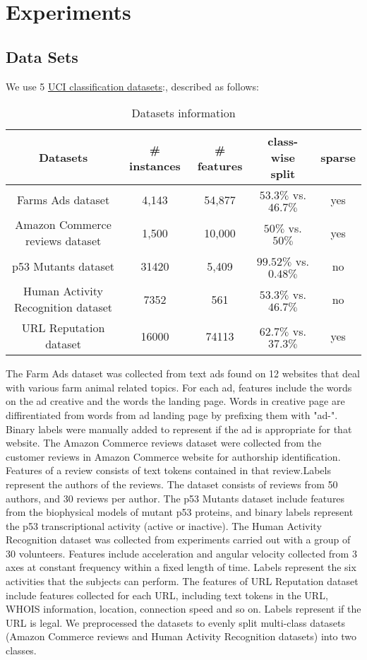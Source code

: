 \section{Experiments}
\label{sec:experiments}

\subsection{Data Sets}


We use 5 \href{http://archive.ics.uci.edu/ml/datasets.html}{UCI classification
datasets}:, described as follows:

\begin{table}
\begin{tabular}{| c | c |  c | c | c |}
  \hline
  Datasets & \# instances & \# features & class-wise split & sparse\\
  \hline
  Farms Ads dataset & 4,143 & 54,877 & $53.3\%$ vs. $46.7\%$ & yes\\
  \hline
  Amazon Commerce reviews dataset & 1,500 & 10,000 & $50\%$ vs. $50\%$ & yes \\
  \hline
  p53 Mutants dataset & 31420 & 5,409 & $99.52\%$ vs.$0.48\%$  & no\\
  \hline
  Human Activity Recognition dataset & 7352 & 561 & $53.3\%$ vs. $46.7\%$  & no\\
  \hline
  URL Reputation dataset\footnotemark[1] & 16000 & 74113 & $62.7\%$ vs. $37.3\%$ & yes \\
  \hline
\end{tabular}
\caption{Datasets information}
\end{table}
The Farm Ads dataset was collected from text ads found on 12 websites that deal with various farm animal related topics. For each ad, features include the words on the ad creative and the words the landing page. Words in creative page are diffirentiated from words from ad landing page by prefixing them with "ad-". Binary labels were manually added to represent if the ad is appropriate for that website. The Amazon Commerce reviews dataset were collected from the customer reviews in Amazon Commerce website for authorship identification. Features of a review consists of text tokens contained in that review.Labels represent the authors of the reviews. The dataset consists of reviews from 50 authors, and 30 reviews per author. The p53 Mutants dataset include features from the biophysical models of mutant p53 proteins, and binary labels represent the p53 transcriptional activity (active or inactive). The Human Activity Recognition dataset was collected from experiments carried out with a group of 30 volunteers. Features include acceleration and angular velocity collected from 3 axes at constant frequency within a fixed length of time. Labels represent the six activities that the subjects can perform. The features of URL Reputation dataset include features collected for each URL, including text tokens in the URL, WHOIS information, location, connection speed and so on. Labels represent if the URL is legal. We preprocessed the datasets to evenly split multi-class datasets (Amazon Commerce reviews and Human Activity Recognition datasets) into two classes.



